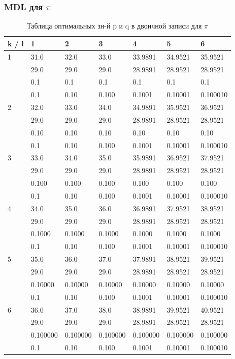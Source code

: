 \documentclass{beamer}%
\begin{document}
	\begin{frame}
		\frametitle{MDL для $\pi$}
		\begin{table}[h]
			\caption{Таблица оптимальных зн-й p и q в двоичной записи для $\pi$}
			\label{table:piBinary}
			\begin{center}
				\begin{tabular}{|l|l|l|l|l|l|l|}
					\hline
					k / l &1 & 2 & 3 & 4 & 5 & 6\\
					\hline
					1 & 31.0& 32.0& 33.0& 33.9891& 34.9521& 35.9521\\
					& 29.0& 29.0& 29.0& 28.9891& 28.9521& 28.9521\\
					& 0.1& 0.1& 0.1& 0.1& 0.1& 0.1\\
					& 0.1& 0.10& 0.100& 0.1001& 0.10001& 0.100010\\
					\hline
					2 & 32.0& 33.0& 34.0& 34.9891& 35.9521& 36.9521\\
					& 29.0& 29.0& 29.0& 28.9891& 28.9521& 28.9521\\
					& 0.10& 0.10& 0.10& 0.10& 0.10& 0.10\\
					& 0.1& 0.10& 0.100& 0.1001& 0.10001& 0.100010\\
					\hline
					3 & 33.0& 34.0& 35.0& 35.9891& 36.9521& 37.9521\\
					& 29.0& 29.0& 29.0& 28.9891& 28.9521& 28.9521\\
					& 0.100& 0.100& 0.100& 0.100& 0.100& 0.100\\
					& 0.1& 0.10& 0.100& 0.1001& 0.10001& 0.100010\\
					\hline
					4 & 34.0& 35.0& 36.0& 36.9891& 37.9521& 38.9521\\
					& 29.0& 29.0& 29.0& 28.9891& 28.9521& 28.9521\\
					& 0.1000& 0.1000& 0.1000& 0.1000& 0.1000& 0.1000\\
					& 0.1& 0.10& 0.100& 0.1001& 0.10001& 0.100010\\
					\hline
					5 & 35.0& 36.0& 37.0& 37.9891& 38.9521& 39.9521\\
					& 29.0& 29.0& 29.0& 28.9891& 28.9521& 28.9521\\
					& 0.10000& 0.10000& 0.10000& 0.10000& 0.10000& 0.10000\\
					& 0.1& 0.10& 0.100& 0.1001& 0.10001& 0.100010\\
					\hline
					6 & 36.0& 37.0& 38.0& 38.9891& 39.9521& 40.9521\\
					& 29.0& 29.0& 29.0& 28.9891& 28.9521& 28.9521\\
					& 0.100000& 0.100000& 0.100000& 0.100000& 0.100000& 0.100000\\
					& 0.1& 0.10& 0.100& 0.1001& 0.10001& 0.100010\\
					\hline
				\end{tabular}
			\end{center}
		\end{table}
	\end{frame}

	\begin{frame}
		\frametitle{}
	\end{frame}
	
\end{document}
